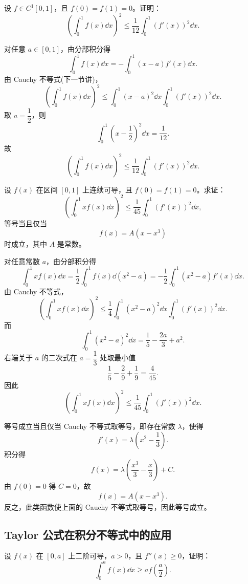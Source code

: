 \begin{problem}
	设 $f\in C^1[0,1]$，且 $f(0)=f(1)=0$。证明：
	\[
	\left(\int_0^1 f(x)\dd x\right)^2
	\leq
	\frac1{12}\int_0^1 (f'(x))^2\dd x.
	\]
\end{problem}

\begin{solution}
	对任意 $a\in[0,1]$，由分部积分得
	\[
	\int_0^1 f(x)\dd x
	=-\int_0^1 (x-a)f'(x)\dd x.
	\]
	由 Cauchy 不等式(下一节讲)，
	\[
	\left(\int_0^1 f(x)\dd x\right)^2
	\leq
	\int_0^1(x-a)^2\dd x
	\int_0^1(f'(x))^2\dd x.
	\]
	取 $a=\dfrac12$，则
	\[
	\int_0^1\left(x-\frac12\right)^2\dd x=\frac1{12}.
	\]
	故
	\[
	\left(\int_0^1 f(x)\dd x\right)^2
	\leq
	\frac1{12}\int_0^1(f'(x))^2\dd x.
	\]
\end{solution}

\begin{problem}
	设 $f(x)$ 在区间 $[0,1]$ 上连续可导，且 $f(0)=f(1)=0$。求证：
	\[
	\left(\int_0^1 x f(x)\dd x\right)^2
	\leq
	\frac1{45}\int_0^1 (f'(x))^2\dd x,
	\]
	等号当且仅当
	\[
	f(x)=A(x-x^3)
	\]
	时成立，其中 $A$ 是常数。
\end{problem}

\begin{solution}
	对任意常数 $a$，由分部积分得
	\[
	\int_0^1 x f(x)\dd x
	=\frac12\int_0^1 f(x)\dd(x^2-a)
	=-\frac12\int_0^1 (x^2-a)f'(x)\dd x.
	\]
	由 Cauchy 不等式，
	\[
	\left(\int_0^1 x f(x)\dd x\right)^2
	\leq
	\frac14\int_0^1(x^2-a)^2\dd x
	\int_0^1(f'(x))^2\dd x.
	\]
	而
	\[
	\int_0^1(x^2-a)^2\dd x
	=\frac15-\frac{2a}{3}+a^2.
	\]
	右端关于 $a$ 的二次式在 $a=\dfrac13$ 处取最小值
	\[
	\frac15-\frac29+\frac19=\frac4{45}.
	\]
	因此
	\[
	\left(\int_0^1 x f(x)\dd x\right)^2
	\leq
	\frac1{45}\int_0^1(f'(x))^2\dd x.
	\]
	
	等号成立当且仅当 Cauchy 不等式取等号，即存在常数 $\lambda$，使得
	\[
	f'(x)=\lambda\left(x^2-\frac13\right).
	\]
	积分得
	\[
	f(x)=\lambda\left(\frac{x^3}{3}-\frac{x}{3}\right)+C.
	\]
	由 $f(0)=0$ 得 $C=0$，故
	\[
	f(x)=A(x-x^3).
	\]
	反之，此类函数使上面的 Cauchy 不等式取等号，因此等号成立。
\end{solution}
\subsection*{Taylor 公式在积分不等式中的应用}

\begin{problem}
	设 $f(x)$ 在 $[0,a]$ 上二阶可导，$a>0$，且 $f''(x)\geqslant0$，证明：
	\[
	\int_0^a f(x)\dd x\geqslant a f\left(\frac a2\right).
	\]
\end{problem}

